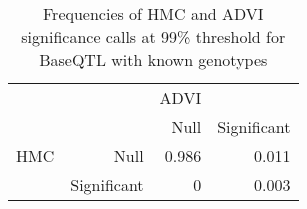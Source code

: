 \begin{table}[ht]
\centering
\caption{Frequencies of HMC and ADVI significance calls at 99\% threshold for BaseQTL with known genotypes} 
\label{tab:GT-xtab-prop-99}
\begin{tabular}{rr|rr}
   &  & ADVI &  \\ 
    &   & Null & Significant \\ 
   \hline
HMC & Null & 0.986 & 0.011 \\ 
    & Significant & 0 & 0.003 \\ 
  \end{tabular}
\end{table}

